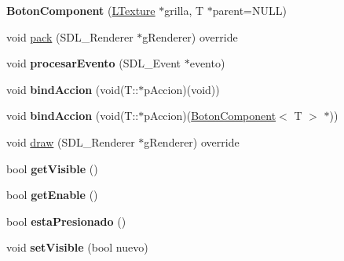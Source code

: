\begin{DoxyCompactItemize}
\item 
{\bfseries Boton\+Component} (\hyperlink{class_l_texture}{L\+Texture} $\ast$grilla, T $\ast$parent=N\+U\+LL)\hypertarget{class_boton_component_a1b246f7b92a8a69a9e6045cfde653e5a}{}\label{class_boton_component_a1b246f7b92a8a69a9e6045cfde653e5a}

\item 
void \hyperlink{class_boton_component_adacc77cd1e8f7d40a2f30b4b7b61899c}{pack} (S\+D\+L\+\_\+\+Renderer $\ast$g\+Renderer) override
\item 
void {\bfseries procesar\+Evento} (S\+D\+L\+\_\+\+Event $\ast$evento)\hypertarget{class_boton_component_adb8885d42fb91509b5d13a535b91948f}{}\label{class_boton_component_adb8885d42fb91509b5d13a535b91948f}

\item 
void {\bfseries bind\+Accion} (void(T\+::$\ast$p\+Accion)(void))\hypertarget{class_boton_component_af57c381f836ca99809f70df6e270ccc8}{}\label{class_boton_component_af57c381f836ca99809f70df6e270ccc8}

\item 
void {\bfseries bind\+Accion} (void(T\+::$\ast$p\+Accion)(\hyperlink{class_boton_component}{Boton\+Component}$<$ T $>$ $\ast$))\hypertarget{class_boton_component_ae98007d5eae6e6bfb180544dbc533236}{}\label{class_boton_component_ae98007d5eae6e6bfb180544dbc533236}

\item 
void \hyperlink{class_boton_component_a73c8c3014be82c952cd8d0e08beffcc5}{draw} (S\+D\+L\+\_\+\+Renderer $\ast$g\+Renderer) override
\item 
bool {\bfseries get\+Visible} ()\hypertarget{class_boton_component_a3204169da97382286dd8b96eaec9e7a5}{}\label{class_boton_component_a3204169da97382286dd8b96eaec9e7a5}

\item 
bool {\bfseries get\+Enable} ()\hypertarget{class_boton_component_a60bdb5f4b30fa92ca442cac257a05243}{}\label{class_boton_component_a60bdb5f4b30fa92ca442cac257a05243}

\item 
bool {\bfseries esta\+Presionado} ()\hypertarget{class_boton_component_a3b5ff7608fa03e2e0c56f46a08cb3e44}{}\label{class_boton_component_a3b5ff7608fa03e2e0c56f46a08cb3e44}

\item 
void {\bfseries set\+Visible} (bool nuevo)\hypertarget{class_boton_component_aa8fcb117c496db9d68168aaf5149d036}{}\label{class_boton_component_aa8fcb117c496db9d68168aaf5149d036}


\end{DoxyCompactItemize}
